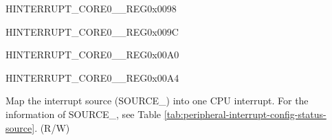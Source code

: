 \begin{register}{H}{INTERRUPT\_CORE0\_\_REG}{0x0098}\label{regdesc:INTERRUPTCORE0CPUINTRFROMCPU2MAPREG}






\end{register}\vspace{-3em}


\begin{register}{H}{INTERRUPT\_CORE0\_\_REG}{0x009C}\label{regdesc:INTERRUPTCORE0CPUINTRFROMCPU3MAPREG}






\end{register}\vspace{-3em}


\begin{register}{H}{INTERRUPT\_CORE0\_\_REG}{0x00A0}\label{regdesc:INTERRUPTCORE0ASSISTDEBUGINTRMAPREG}






\end{register}\vspace{-3em}

















































\begin{register}{H}{INTERRUPT\_CORE0\_\_REG}{0x00A4}\label{regdesc:INTERRUPTCORE0PIFPMSMONITORVIOLATESIZEINTRMAPREG}
%
%
\regnewline%
\begin{regdesc}\begin{reglist}
\label{fielddesc:INTERRUPTCORE0CACHECORE0ACSINTMAP}\item [INTERRUPT\_CORE0\_SOURCE\_\regindex{X}\_MAP] Map the interrupt source (SOURCE\_) into one CPU interrupt. For the information of SOURCE\_, see Table \ref{tab:peripheral-interrupt-config-status-source}. (R/W)
\end{reglist}\end{regdesc}
\end{register}


